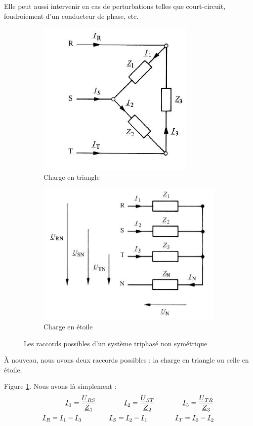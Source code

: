 \documentclass[12pt,a4paper]{article}
\newcommand{\uz}{\uline{Z} }
\newcommand{\ui}{\uline{I} }
\newcommand{\uu}{\uline{U} }
\begin{document}
Elle peut aussi intervenir en cas de perturbations telles que court-circuit, foudroiement d'un conducteur de phase, etc.
\begin{figure}
	\begin{subfigure}[b]{0.45\textwidth}
		\centering
		\includegraphics[scale=0.65]{images/charge_triangle_asym}
		\caption{Charge en triangle}
		\label{subfig: charge triangle asym}
	\end{subfigure}
	\begin{subfigure}[b]{0.45\textwidth}
		\centering
		\includegraphics[scale=0.65]{images/charge_etoile_asym}
		\caption{Charge en étoile}
		\label{subfig: charge etoie asym}
	\end{subfigure}
	\caption{Les raccords possibles d'un système triphasé non symétrique}
\end{figure}
À nouveau, nous avons deux raccords possibles : la charge en triangle ou celle en étoile.

 Figure \ref{subfig: charge triangle asym}. Nous avons là simplement :
\begin{align*}
	\ui_1 = \frac{\uu_{RS}}{\uz_1} \qquad \qquad \ui_2 = \frac{\uu_{ST}}{\uz_2} \qquad \qquad \ui_3 = \frac{\uu_{TR}}{\uz_3}\\
	\ui_R = \ui_1 - \ui_3 \qquad \qquad \ui_S = \ui_2 - \ui_1 \qquad \qquad \ui_T = \ui_3 - \ui_2
\end{align*}
\end{document}
